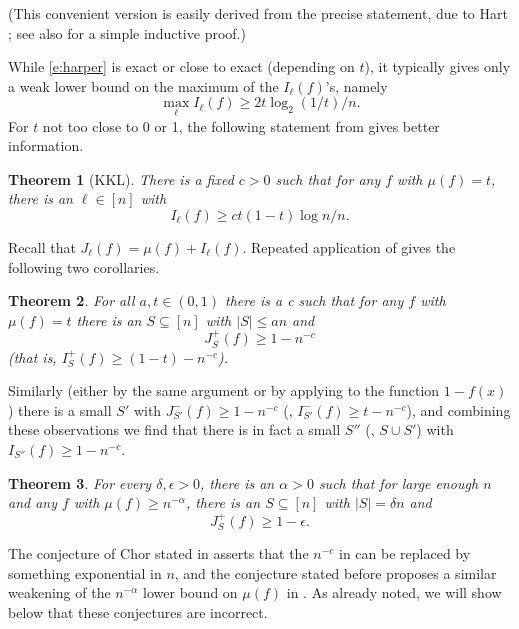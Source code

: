 \documentclass{toc}
\newtheorem{thm}{Theorem}[section]
\newcommand{\mn}[0]{\medskip\noindent}
\newcommand{\nin}[0]{\noindent}
\newcommand{\sub}[0]{\subseteq}
\newcommand{\0}[0]{\emptyset}
\newcommand{\ga}[0]{\alpha }
\begin{document}
\mn
(This convenient version is easily derived from the precise
statement, due to Hart \cite{Hart}; see also \cite[Sec. 7]{KK07}
for a simple inductive proof.)

\mn
While \eqref{e:harper} is exact or close to exact
(depending on $t$), it typically gives
only a weak lower bound on the maximum of the %
$I_\ell (f)$'s,   %
namely
\begin {equation}
\label {e:harper-max}
\max_\ell I_\ell (f) \ge  2t \log_2 (1/t)/n.
\end {equation}
For $t$ not too close to 0 or 1, the
following
statement from \cite{kkl} gives
better information.


\begin{thm} [KKL]
\label {t:kkl}
There is a fixed $c>0$ such that
for any
$f$ with $\mu(f) =t$,
there is an $\ell \in [n]$ with
\begin {equation}
\label {e:kkl}
I_\ell (f) \ge c t (1-t)\log n/n.
\end {equation}
\end {thm}
\nin
Recall that $J_\ell (f)=\mu(f) +I_\ell (f)$. Repeated application of  gives
the following two corollaries.

\begin {thm}
\label {t:ra1}
For all $a, t\in (0,1)$ there is a c such that
for any
$f$ with $\mu(f) =t$ there
is an $S\sub [n]$ with $|S|\leq an$ and
$$J^+_S(f) \ge 1 - n^{-c}$$ (that is,
$I^+_S(f) \ge (1-t) - n^{-c}$).

\end {thm}
\nin
Similarly (either by the same argument or by applying
 to the function $1-f(x)$)
there is a small $S'$
with
$J^-_{S'}(f) \ge 1 - n^{-c}$ (\ie, $I^-_{S'}(f) \ge t - n^{-c}$),
and combining these observations we find that there is
in fact a small $S''$ (\eg, $S \cup S'$) with
$I_{S''}(f) \ge 1-n^{-c}$.


\begin {thm}
\label {t:ra2}
For every $\delta, \epsilon >0$,
there is an $\ga>0$ such that for large enough
$n$ and any
$f$ with $\mu(f) \geq  n^{-\ga}$,
there is an $S\sub [n]$ with $|S|=\delta n$ and
 $$J^+_S(f) \ge 1-\epsilon.$$
\end {thm}


\mn
The conjecture of
Chor stated in 
asserts that the $n^{-c}$ in
 can be replaced
by something exponential in $n$,
and the conjecture stated before
 proposes a similar weakening
of the $n^{-\ga}$ lower bound on $\mu(f) $ in
.
As already noted, we
will show below that these conjectures are incorrect.
\end{document}
